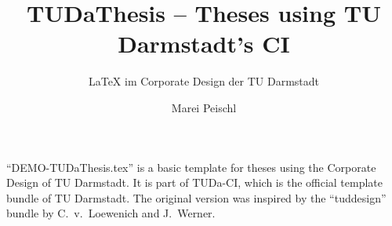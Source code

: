 \documentclass[
	english,%
	accentcolor=9c,%
	ruledheaders=section,%
	class=report,%
	thesis={type=bachelor},%
	fontsize=11pt,%
	parskip=half-,%
	custommargins=true,%
	marginpar=false,%
]{tudapub}
\title{TUDaThesis -- Theses using TU Darmstadt's CI}
\subtitle{\LaTeX{} im Corporate Design der TU Darmstadt}
\author{Marei Peischl}
\institute{Institute}
\begin{document}
\maketitle


\tableofcontents



\enquote{DEMO-TUDaThesis.tex} is a basic template for theses using the Corporate Design of TU Darmstadt.
It is part of TUDa-CI, which is the official template bundle of TU Darmstadt. The original version was inspired by the \enquote{tuddesign} bundle by C.~v.~Loewenich and J.~Werner.




\printbibliography
\end{document}
